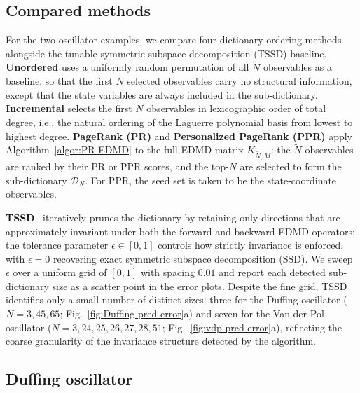 \documentclass{article}
\theoremstyle{plain}
\theoremstyle{definition}
\def\Dc{\mathcal{D}}
\newcommand{\arXivtag}[1][]{#1}
\begin{document}
	\subsection{Compared methods}\label{app:comp-methods}
	
	For the two oscillator examples, we compare four dictionary ordering methods alongside the tunable symmetric subspace decomposition (TSSD) baseline. \textbf{Unordered} uses a uniformly random permutation of all $\tilde{N}$ observables as a baseline, so that the first $N$ selected observables carry no structural information\arXivtag[, except that the state variables are always included in the sub-dictionary.] \textbf{Incremental} selects the first $N$ observables in lexicographic order of total degree, i.e., the natural ordering of the Laguerre polynomial basis from lowest to highest degree. \textbf{PageRank (PR)} and \textbf{Personalized PageRank (PPR)} apply Algorithm~\ref{algor:PR-EDMD} to the full EDMD matrix $K_{\tilde{N},M}$: the $\tilde{N}$ observables are ranked by their PR or PPR scores, and the top-$N$ are selected to form the sub-dictionary $\Dc_N$. For PPR, the seed set is taken to be the state-coordinate observables. 
	
	\textbf{TSSD}~\cite{haseli2021learning} iteratively prunes the dictionary by retaining only directions that are approximately invariant under both the forward and backward EDMD operators; the tolerance parameter $\epsilon \in [0,1]$ controls how strictly invariance is enforced, with $\epsilon = 0$ recovering exact symmetric subspace decomposition (SSD). We sweep $\epsilon$ over a uniform grid of $[0,1]$ with spacing $0.01$ and report each detected sub-dictionary size as a scatter point in the error plots. Despite the fine grid, TSSD identifies only a small number of distinct sizes: three for the Duffing oscillator ($N = 3, 45, 65$; Fig.~\ref{fig:Duffing-pred-error}a) and seven for the Van der Pol oscillator ($N = 3, 24, 25, 26, 27, 28, 51$; Fig.~\ref{fig:vdp-pred-error}a), reflecting the coarse granularity of the invariance structure detected by the algorithm.



\subsection{Duffing oscillator}\label{app:duffing}
\end{document}
